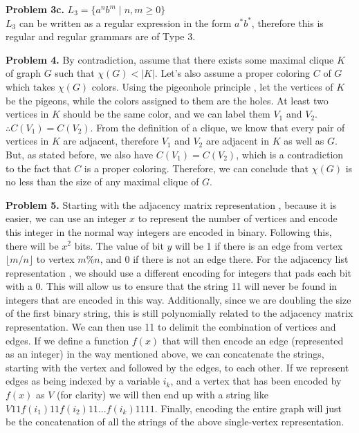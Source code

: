 \documentclass{article}
\begin{document}
\textbf{Problem 3c.} $L_3 = \{ a^nb^m \mid n,m \geq 0 \}$ \\
$L_3$ can be written as a regular expression in the form $a^*b^*$, therefore this is regular and regular grammars are of Type 3.

\hfill

\textbf{Problem 4.} By contradiction, assume that there exists some maximal clique $K$ of graph $G$ such that $\chi(G) < |K|$. Let's also assume a proper coloring \cite{website:4} $C$ of $G$ which takes $\chi(G)$ colors. Using the pigeonhole principle \cite{website:3}, let the vertices of $K$ be the pigeons, while the colors assigned to them are the holes. At least two vertices in $K$ should be the same color, and we can label them $V_1$ and $V_2$. $\therefore C(V_1) = C(V_2)$. From the definition of a clique, we know that every pair of vertices in $K$ are adjacent, therefore $V_1$ and $V_2$ are adjacent in $K$ as well as $G$. But, as stated before, we also have $C(V_1) = C(V_2)$, which is a contradiction to the fact that $C$ is a proper coloring. Therefore, we can conclude that $\chi(G)$ is no less than the size of any maximal clique of $G$.

\hfill

\textbf{Problem 5.} Starting with the adjacency matrix representation \cite{website:5}, because it is easier, we can use an integer $x$ to represent the number of vertices and encode this integer in the normal way integers are encoded in binary. Following this, there will be $x^2$ bits. The value of bit $y$ will be 1 if there is an edge from vertex $\lfloor m/n \rfloor$ to vertex $m\%n$, and 0 if there is not an edge there. For the adjacency list representation \cite{website:5}, we should use a different encoding for integers that pads each bit with a 0. This will allow us to ensure that the string 11 will never be found in integers that are encoded in this way. Additionally, since we are doubling the size of the first binary string, this is still polynomially related to the adjacency matrix representation.  We can then use 11 to delimit the combination of vertices and edges. If we define a function $f(x)$ that will then encode an edge (represented as an integer) in the way mentioned above, we can concatenate the strings, starting with the vertex and followed by the edges, to each other. If we represent edges as being indexed by a variable $i_k$, and a vertex that has been encoded by $f(x)$ as $V$ (for clarity) we will then end up with a string like $V11f(i_1)11f(i_2)11...f(i_k)1111$. Finally, encoding the entire graph will just be the concatenation of all the strings of the above single-vertex representation.

\newpage
 

\end{document}
